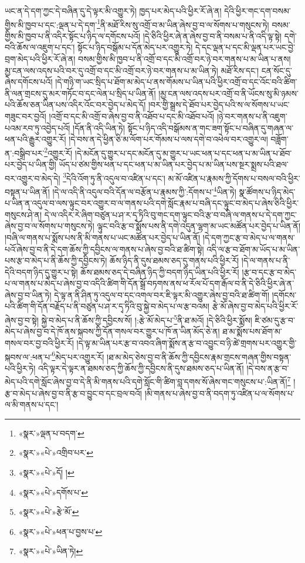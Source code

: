 ཡང་ན་དེ་དག་ཀྱང་དེ་བཞིན་དུ་དེ་ལྟར་མི་འགྱུར་ཏེ། ཁྱད་པར་མེད་པའི་ཕྱིར་རོ་ཞེ་ན། དེའི་ཕྱིར་གང་དག་བསམ་གྱིས་མི་ཁྱབ་པ་དང་:ལྡན་པ་དེ་དག་\footnote{«སྣར་»ལྡན་པ་བདག་}ནི་མཐོ་རིས་སུ་འགྲོ་བ་མ་ཡིན་ཞེས་བྱ་བ་ལ་སོགས་པ་གསུངས་ཏེ། བསམ་གྱིས་མི་ཁྱབ་པ་ནི་འདིར་སྟོང་པ་ཉིད་ལ་དགོངས་པའོ། །དེ་ཅིའི་ཕྱིར་ཞེ་ན་ཞེས་བྱ་བ་ནི་བསམ་པ་ནི་འདི་ལྟ་སྟེ། དགེ་བའི་ཆོས་ལ་འཇུག་པ་དང་། སྟོང་པ་ཉིད་བསྒོམ་པ་དོན་མེད་པར་འགྱུར་ཏེ། དེ་དང་ལྡན་པ་དང་མི་ལྡན་པར་ཡང་བྱེ་བྲག་མེད་པའི་ཕྱིར་རོ་ཞེ་ན། བསམ་གྱིས་མི་ཁྱབ་པ་ནི་འགྲོ་བ་དང་མི་འགྲོ་བར་ཉེ་བར་གནས་པ་མ་ཡིན་པ་ནས། མྱ་ངན་ལས་འདས་པའི་བར་དུ་འགྲོ་བ་དང་མི་འགྲོ་བར་ཉེ་བར་གནས་པ་མ་ཡིན་ཏེ། མཐོ་རིས་དང་། ངན་སོང་དུ་ཞེས་དགོངས་པའོ། །དེ་གཉི་ག་ཡང་སྲིད་པ་ཐོག་མ་མེད་པ་ནས་གོམས་པ་ཡིན་པའི་ཕྱིར་འགྲོ་བ་དང་འོང་བའི་ཚིག་ནི་ལན་གྲངས་དུ་མར་གཏོང་བ་དང་ལེན་པ་སྲིད་པ་ཡིན་ནོ། །མྱ་ངན་ལས་འདས་པར་འགྲོ་བ་ནི་ཡོངས་སུ་མི་ཉམས་པའི་ཆོས་ཅན་ཡིན་པས་འདིར་འོང་བར་བྱེད་པ་མེད་དོ། །བར་གྱི་སྒྲས་དེ་ཐོབ་པར་བྱེད་པའི་ས་ལ་སོགས་པ་ཡང་གཟུང་བར་བྱའོ། །འགྲོ་བ་དང་མི་འགྲོ་བ་ཞེས་བྱ་བ་ནི་འཐོབ་པ་དང་མི་འཐོབ་པའོ། །ཉེ་བར་གནས་པ་ནི་འཇུག་པའམ་རབ་ཏུ་འབྱེད་པའོ། །དོན་ནི་འདི་ཡིན་ཏེ། སྟོང་པ་ཉིད་འདི་བསྒོམས་ན་གང་ཟག་སྟོང་པ་བཞིན་དུ་གཞན་ལ་ཕན་པའི་རྒྱུར་འགྱུར་རོ། །དེ་བས་ན་དེ་ཕྱིན་ཅི་མ་ལོག་པར་གོམས་པ་ལས་དགེ་བ་འཕེལ་བར་འགྱུར་ལ། བཟློག་ན་:བསྒྲིབ་པར་\footnote{«སྣར་»«པེ་»འགྲིབ་པར་}འགྱུར་རོ། །དེ་མངོན་དུ་གྱུར་པ་དང་མངོན་དུ་མ་གྱུར་པ་ཡང་ཕན་པ་དང་ཕན་པ་མ་ཡིན་པ་ཐོབ་པར་བྱེད་པ་ཡིན་གྱི། ཡོད་པ་ཙམ་གྱིས་ཕན་པ་དང་ཕན་པ་མ་ཡིན་པར་བྱེད་པ་མ་ཡིན་པས་སྔར་སྨྲས་པའི་ཐལ་བར་འགྱུར་བ་མེད་དེ། \footnote{«སྣར་»«པེ་»དོ། ། }དེའི་འོག་ཏུ་ནི་འདུལ་བ་འཛིན་པ་དང་། མ་མོ་འཛིན་པ་རྣམས་ཀྱི་དོགས་པ་བསལ་བའི་ཕྱིར་བསྟན་པ་ཡིན་ནོ། །དེ་ལ་འདི་ནི་འདུལ་བའི་དོན་ལ་བརྩོན་པ་རྣམས་ཀྱི་:དོགས་པ་\footnote{«སྣར་»«པེ་»དགོས་པ་}ཡིན་ཏེ། སྣ་ཚོགས་པ་ཉིད་མེད་པ་ཡིན་ན་འདུལ་བ་ལས་ལྟུང་བར་འགྱུར་བ་ལ་གནས་པའི་དགེ་སློང་རྣམ་པ་བཞི་དང་ལྟུང་བ་མེད་པ་ཞེས་ཅིའི་ཕྱིར་གསུངས་ཤེ་ན། དེ་ལ་འདིར་རེ་ཞིག་བཙུན་པ་ཤ་ར་དྭ་ཏིའི་བུ་གང་དག་ལྟུང་བའི་རྩ་བ་བཞི་ལ་གནས་པ་དེ་དག་ཀྱང་ཞེས་བྱ་བ་ལ་སོགས་པ་གསུངས་ཏེ། ལྟུང་བའི་རྩ་བ་སྨོས་པས་ནི་དགེ་འདུན་ལྷག་མ་ཡང་མཚོན་པར་བྱེད་པ་ཡིན་ནོ། །བཞི་ལ་གནས་པ་སྨོས་པས་ནི་མི་གནས་པ་ཡང་མཚོན་པར་བྱེད་པ་ཡིན་ནོ། །དེ་དག་ཀྱང་རྩ་བ་མེད་པ་ལ་གནས་པའོ་ཞེས་བྱ་བ་ནི་དེ་དག་ཆོས་ཀྱི་དབྱིངས་ལ་གནས་པ་ཞེས་བྱ་བའི་ཐ་ཚིག་སྟེ། འདི་ལ་རྩ་བ་ཐོག་མ་ཡོད་པ་མ་ཡིན་པས་རྩ་བ་མེད་པ་ནི་ཆོས་ཀྱི་དབྱིངས་ཏེ། ཆོས་ཉིད་ནི་དུས་ཐམས་ཅད་དུ་གནས་པའི་ཕྱིར་རོ། །དེ་ལ་གནས་པ་ནི་དེའི་བདག་ཉིད་དུ་གྱུར་པ་སྟེ། ཆོས་ཐམས་ཅད་དེ་བཞིན་ཉིད་ཀྱི་བདག་ཉིད་ཡིན་པའི་ཕྱིར་རོ། །རྩ་བ་དང་རྩ་བ་མེད་པ་ལ་གནས་པ་མེད་པ་ཞེས་བྱ་བ་འདིའི་ཚིག་གི་དོན་སྒྲོ་བཏགས་ནས་ཕ་རོལ་པོ་དག་རྒོལ་བ་ནི་དེ་ཅིའི་ཕྱིར་ཞེ་ན་ཞེས་བྱ་བ་ཡིན་ཏེ། དེ་ལྟ་ན་ནི་ཤིན་ཏུ་འདུལ་བ་དང་འགལ་བར་ཇི་ལྟར་མི་འགྱུར་ཞེས་བྱ་བའི་ཐ་ཚིག་གོ། །དགོངས་པའི་ཚིག་གི་དོན་བརྗོད་པ་ནི་བཙུན་པ་ཤ་ར་དྭ་ཏིའི་བུ་སྐྱེ་བ་མེད་པ་ལ་རྩ་བའམ། རྩེ་མོ་ཞེས་བྱ་བ་མེད་པའི་ཕྱིར་རོ་ཞེས་བྱ་བ་སྟེ། སྐྱེ་བ་མེད་པ་ནི་ཆོས་ཀྱི་དབྱིངས་སོ། །:རྩེ་མོ་མེད་པ་\footnote{«སྣར་»«པེ་»རྩེ་མོ་}ནི་ཐ་མའོ། །དེ་ཅིའི་ཕྱིར་སྨོས། ཇི་ཙམ་དུ་རྩ་བ་མེད་པ་ཞེས་བྱ་བ་དེ་ཁོ་ནས་སྐབས་ཀྱི་དོན་གསལ་བར་གྱུར་པ་ཁོ་ན་ཡིན་མོད་ཅེ་ན། ཐ་མ་སྨོས་པས་ཐོག་མ་གསལ་བར་བྱ་བའི་ཕྱིར་རོ། །དེ་ལྟ་མ་ཡིན་པར་རྩ་བ་འབའ་ཞིག་སྨོས་ན་རྩ་བ་འབྱུང་བ་ཉི་ཚེ་གྲགས་པར་འགྱུར་གྱི་སྐབས་ལ་:ཕན་པ་\footnote{«སྣར་»«པེ་»ཕན་པ་བྱས་པ་}མེད་པར་འགྱུར་རོ། །ཐ་མ་མེད་ཅེས་བྱ་བ་ནི་ཆོས་ཀྱི་དབྱིངས་རྣམ་གྲངས་གཞན་གྱིས་བསྟན་པའི་ཕྱིར་ཏེ། འདི་ལྟར་དེ་ལྟར་ན་ཐམས་ཅད་ཀྱི་ཆོས་ཀྱི་དབྱིངས་ནི་དུས་ཐམས་ཅད་པ་ཡིན་ནོ། །དེ་བས་ན་རྩ་བ་མེད་པའི་དགེ་སློང་ཞེས་བྱ་བ་དེ་ནི་མི་གནས་པའི་དགེ་སློང་གི་ཚིག་བླ་དགས་སོ་ཞེས་གང་གསུངས་པ་:ཡིན་ནོ།\footnote{«སྣར་»«པེ་»ཡིན་ཏེ།} །རྩ་བ་མེད་པ་ཞེས་བྱ་བ་ནི་རྩ་བ་བྱུང་བ་དང་བྲལ་བའོ། །མི་གནས་པ་ཞེས་བྱ་བ་ནི་བདག་ཏུ་འཛིན་པ་ལ་སོགས་པ་ལ་མི་གནས་པ་དང་། 